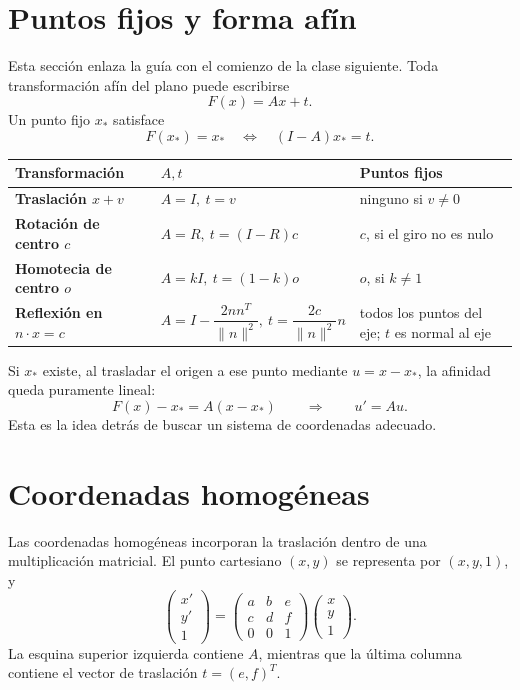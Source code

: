 \section{Puntos fijos y forma afín}\label{sec:puntos-fijos-afin}

Esta sección enlaza la guía con el comienzo de la clase siguiente. Toda transformación afín
del plano puede escribirse
\[
  F(x)=Ax+t.
\]
Un punto fijo \(x_\ast\) satisface
\[
  F(x_\ast)=x_\ast
  \quad\Longleftrightarrow\quad
  (I-A)x_\ast=t.
\]

\begin{center}
\begin{tabularx}{\textwidth}{>{\bfseries}l l X}
\toprule
Transformación & \(A,t\) & Puntos fijos\\
\midrule
Traslación \(x+v\) & \(A=I,\ t=v\) & ninguno si \(v\neq0\)\\
Rotación de centro \(c\) & \(A=R,\ t=(I-R)c\) & \(c\), si el giro no es nulo\\
Homotecia de centro \(o\) & \(A=kI,\ t=(1-k)o\) & \(o\), si \(k\neq1\)\\
Reflexión en \(n\cdot x=c\) &
\(A=I-\dfrac{2nn^T}{\lVert n\rVert^2},\
t=\dfrac{2c}{\lVert n\rVert^2}n\) &
todos los puntos del eje; \(t\) es normal al eje\\
\bottomrule
\end{tabularx}
\end{center}

Si \(x_\ast\) existe, al trasladar el origen a ese punto mediante \(u=x-x_\ast\), la afinidad
queda puramente lineal:
\[
  F(x)-x_\ast=A(x-x_\ast)
  \qquad\Longrightarrow\qquad
  u'\!=Au.
\]
Esta es la idea detrás de buscar un sistema de coordenadas adecuado.

\section{Coordenadas homogéneas}\label{sec:homogeneas}

Las coordenadas homogéneas incorporan la traslación dentro de una multiplicación matricial.
El punto cartesiano \((x,y)\) se representa por \((x,y,1)\), y
\[
\begin{pmatrix}
x'\\y'\\1
\end{pmatrix}
=
\begin{pmatrix}
a&b&e\\
c&d&f\\
0&0&1
\end{pmatrix}
\begin{pmatrix}
x\\y\\1
\end{pmatrix}.
\]
La esquina superior izquierda contiene \(A\), mientras que la última columna contiene
el vector de traslación \(t=(e,f)^T\).

